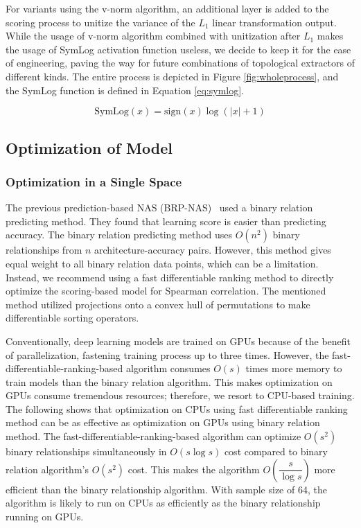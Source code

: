 \documentclass[lettersize,journal]{IEEEtran}
\begin{document}
        For variants using the v-norm algorithm, an additional layer is added to the scoring process to unitize the variance of the $L_1$ linear transformation output. While the usage of v-norm algorithm combined with unitization after $L_1$ makes the usage of SymLog activation function useless, we decide to keep it for the ease of engineering, paving the way for future combinations of topological extractors of different kinds. The entire process is depicted in Figure \ref{fig:wholeprocess}, and the SymLog function is defined in Equation \ref{eq:symlog}.
        
        \begin{equation}
        \mathrm{SymLog}(x) = \mathrm{sign}(x)\log\left(\left|x\right| + 1\right) \label{eq:symlog}
        \end{equation}

\subsection{Optimization of Model} \label{sec:model_opt}

        \subsubsection{Optimization in a Single Space} The previous prediction-based NAS (BRP-NAS) \cite{BRP-NAS}\ used a binary relation predicting method. They found that learning score is easier than predicting accuracy. The binary relation predicting method uses $O(n^2)$ binary relationships from $n$ architecture-accuracy pairs. However, this method gives equal weight to all binary relation data points, which can be a limitation. Instead, we recommend using a fast differentiable ranking method \cite{fast-soft-sort} to directly optimize the scoring-based model for Spearman correlation. The mentioned method utilized projections onto a convex hull of permutations to make differentiable sorting operators.

            Conventionally, deep learning models are trained on GPUs because of the benefit of parallelization, fastening training process up to three times. However, the fast-differentiable-ranking-based algorithm consumes $O(s)$ times more memory to train models than the binary relation algorithm. This makes optimization on GPUs consume tremendous resources; therefore, we resort to CPU-based training. The following shows that optimization on CPUs using fast differentiable ranking method can be as effective as optimization on GPUs using binary relation method. The fast-differentiable-ranking-based algorithm can optimize $O\left(s^2\right)$ binary relationships simultaneously in $O(s \log s)$ cost compared to binary relation algorithm's $O\left(s^2\right)$ cost. This makes the algorithm $O\left(\dfrac{s}{\log s}\right)$ more efficient than the binary relationship algorithm. With sample size of 64, the algorithm is likely to run on CPUs as efficiently as the binary relationship running on GPUs.
            
\end{document}
